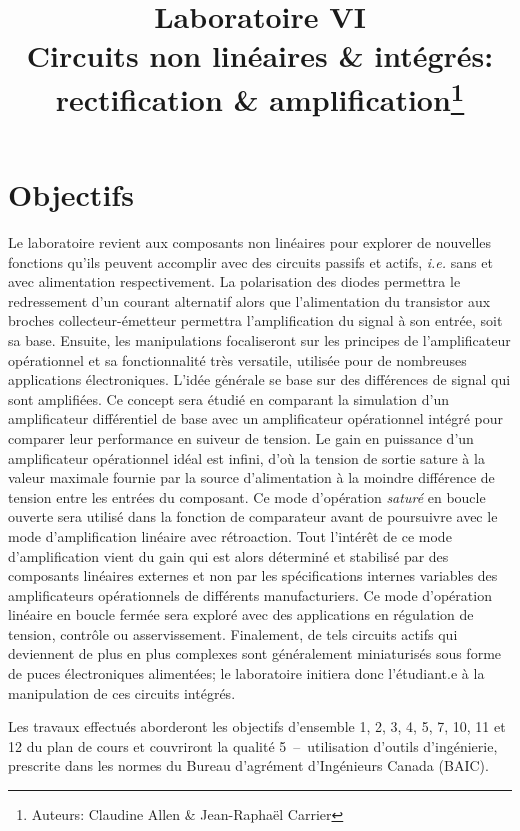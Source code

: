 \documentclass[canadien,12pt,oneside,letterpaper]{article}
\title{\textbf{Laboratoire VI}\\Circuits non linéaires \& intégrés:\\rectification \& amplification\thanks{Auteurs: Claudine Allen \& Jean-Raphaël Carrier}}
\date{}
\begin{document}
\maketitle \vspace{-2cm}

\section{Objectifs}

Le laboratoire revient aux composants non linéaires pour explorer de nouvelles fonctions qu'ils peuvent accomplir avec des circuits passifs et actifs, \textit{i.e.} sans et avec alimentation respectivement. La polarisation des diodes permettra le redressement d’un courant alternatif alors que l'alimentation du transistor aux broches collecteur-émetteur permettra l'amplification du signal à son entrée, soit sa base. Ensuite, les manipulations focaliseront sur les principes de l’amplificateur opérationnel et sa fonctionnalité très versatile, utilisée pour de nombreuses applications électroniques. L’idée générale se base sur des différences de signal qui sont amplifiées. Ce concept sera étudié en comparant la simulation d’un amplificateur différentiel de base avec un amplificateur opérationnel intégré pour comparer leur performance en suiveur de tension. Le gain en puissance d’un amplificateur opérationnel idéal est infini, d’où la tension de sortie sature à la valeur maximale fournie par la source d’alimentation à la moindre différence de tension entre les entrées du composant. Ce mode d’opération \textit{saturé} en boucle ouverte sera utilisé dans la fonction de comparateur avant de poursuivre avec le mode d’amplification linéaire avec rétroaction. Tout l’intérêt de ce mode d’amplification vient du gain qui est alors déterminé et stabilisé par des composants linéaires externes et non par les spécifications internes variables des amplificateurs opérationnels de différents manufacturiers. Ce mode d’opération linéaire en boucle fermée sera exploré avec des applications en régulation de tension, contrôle ou asservissement. Finalement, de tels circuits actifs qui deviennent de plus en plus complexes sont généralement miniaturisés sous forme de puces électroniques alimentées; le laboratoire initiera donc l'étudiant.e à la manipulation de ces circuits intégrés.

Les travaux effectués aborderont les objectifs d’ensemble 1, 2, 3, 4, 5, 7, 10, 11 et 12 du plan de cours et couvriront la qualité 5~--~utilisation d’outils d’ingénierie, prescrite dans les normes du Bureau d’agrément d’Ingénieurs Canada (BAIC).
\end{document}
